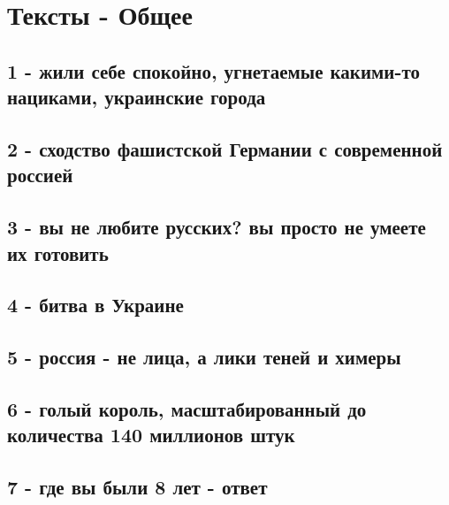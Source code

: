  
 
 
 
 

\section{Тексты - Общее}

\subsection{1 - жили себе спокойно, угнетаемые какими-то нациками, украинские города}

\subsection{2 - сходство фашистской Германии с современной россией}

\subsection{3 - вы не любите русских? вы просто не умеете их готовить}

\subsection{4 - битва в Украине}

\subsection{5 - россия - не лица, а лики теней и химеры}

\subsection{6 - голый король, масштабированный до количества 140 миллионов штук}

\subsection{7 - где вы были 8 лет - ответ}

